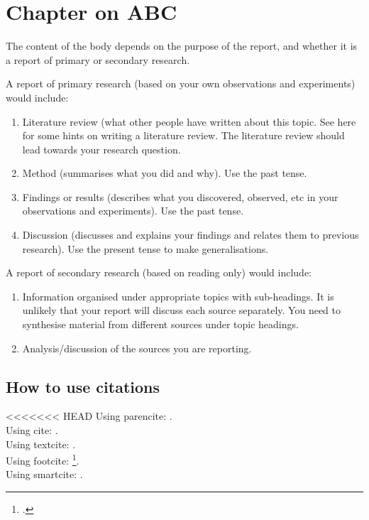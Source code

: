 \chapter{Chapter on ABC}
The content of the body depends on the purpose of the report, and whether it is a report of primary or secondary research.

A report of primary research (based on your own observations and experiments) would include:
\begin{enumerate}
\item
Literature review (what other people have written about this topic. See here for some hints on writing a literature review. The literature review should lead towards your research question.
\item
Method (summarises what you did and why). Use the past tense.
\item
Findings or results (describes what you discovered, observed, etc in your observations and experiments). Use the past tense.
\item
Discussion (discusses and explains your findings and relates them to previous research). Use the present tense to make generalisations.
\end{enumerate}
A report of secondary research (based on reading only) would include:
\begin{enumerate}
\item
Information organised under appropriate topics with sub-headings. It is unlikely that your report will discuss each source separately. You need to synthesise material from different sources under topic headings.
\item
Analysis/discussion of the sources you are reporting.
\end{enumerate}
\section{How to use citations}

<<<<<<< HEAD
Using parencite: \parencite{RN4}.\\

Using cite: \cite[prenote][postnote]{RN4}.\\

Using textcite: \textcite{RN4}.\\

Using footcite: \footcite[prenote][postnote]{RN4}.\\

Using smartcite: \smartcite{RN4}.\\
 
